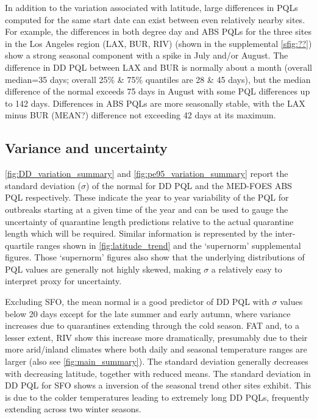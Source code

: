 \documentclass[10pt,a4paper,twocolumn]{article}
\begin{document}
In addition to the variation associated with latitude, 
large differences in PQLs computed for the same start date 
can exist between even relatively nearby sites.
For example, the differences in both degree day and ABS PQLs 
for the three sites in the Los Angeles region (LAX, BUR, RIV) 
(shown in the supplemental \autoref{sfig:??})
show a strong seasonal component with a spike in July and/or August.
The difference in DD PQL between LAX and BUR is normally about a month
(overall median=35 days; overall 25\% \& 75\% quantiles are 28 \& 45 days), 
but the median difference of the normal exceeds 75 days in August with some 
PQL differences up to 142 days.
Differences in ABS PQLs are more seasonally stable, 
with the LAX minus BUR (MEAN?) difference not exceeding 42 days at its maximum.


\subsection*{Variance and uncertainty}

\autoref{fig:DD_variation_summary} and \autoref{fig:pe95_variation_summary}
report the standard deviation ($\sigma$) of the normal for DD PQL and the MED-FOES ABS PQL 
respectively.
These indicate the year to year variability of the PQL for outbreaks starting at a
given time of the year and can be used to gauge the uncertainty of quarantine 
length predictions relative to the actual quarantine length which will be required.
Similar information is represented by the inter-quartile ranges 
shown in \autoref{fig:latitude_trend} and the `supernorm' supplemental figures.
Those `supernorm' figures also show that the underlying distributions of PQL 
values are generally not highly skewed, making $\sigma$ a relatively easy to interpret 
proxy for uncertainty.

Excluding SFO, the mean normal is a good predictor of DD PQL with $\sigma$ values below 20 days
except for the late summer and early autumn, where variance increases 
due to quarantines extending through the cold season.
FAT and, to a lesser extent, RIV show this increase more dramatically, presumably due to their more 
arid/inland climates where both daily and seasonal temperature ranges are larger
(also see \autoref{fig:main_summary}).
The standard deviation generally decreases with decreasing latitude, together with reduced means.
The standard deviation in DD PQL for SFO shows a inversion of the seasonal trend 
other sites exhibit.
This is due to the colder temperatures leading to extremely long DD PQLs, 
frequently extending across two winter seasons.
\end{document}
